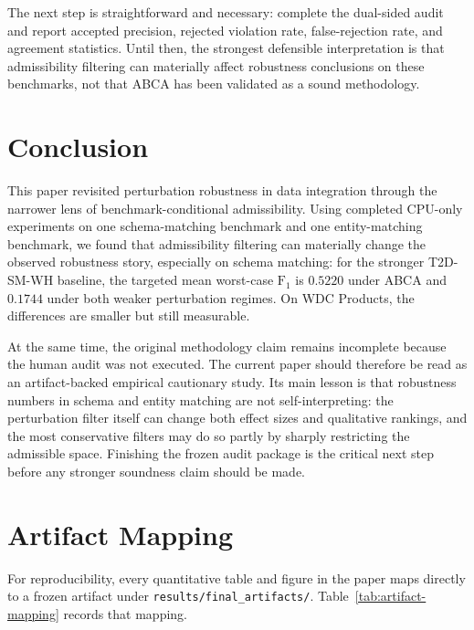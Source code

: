 \documentclass{article}
\newcommand{\abca}{\textsc{ABCA}}
\newcommand{\fonescore}{\ensuremath{\mathrm{F}_{1}}}
\begin{document}
The next step is straightforward and necessary: complete the dual-sided audit and report accepted precision, rejected violation rate, false-rejection rate, and agreement statistics. Until then, the strongest defensible interpretation is that admissibility filtering can materially affect robustness conclusions on these benchmarks, not that \abca{} has been validated as a sound methodology.

\section{Conclusion}
This paper revisited perturbation robustness in data integration through the narrower lens of benchmark-conditional admissibility. Using completed CPU-only experiments on one schema-matching benchmark and one entity-matching benchmark, we found that admissibility filtering can materially change the observed robustness story, especially on schema matching: for the stronger T2D-SM-WH baseline, the targeted mean worst-case \fonescore{} is $0.5220$ under \abca{} and $0.1744$ under both weaker perturbation regimes. On WDC Products, the differences are smaller but still measurable.

At the same time, the original methodology claim remains incomplete because the human audit was not executed. The current paper should therefore be read as an artifact-backed empirical cautionary study. Its main lesson is that robustness numbers in schema and entity matching are not self-interpreting: the perturbation filter itself can change both effect sizes and qualitative rankings, and the most conservative filters may do so partly by sharply restricting the admissible space. Finishing the frozen audit package is the critical next step before any stronger soundness claim should be made.

{\small


}

\appendix

\section{Artifact Mapping}
For reproducibility, every quantitative table and figure in the paper maps directly to a frozen artifact under \texttt{results/final\_artifacts/}. Table~\ref{tab:artifact-mapping} records that mapping.
\end{document}

